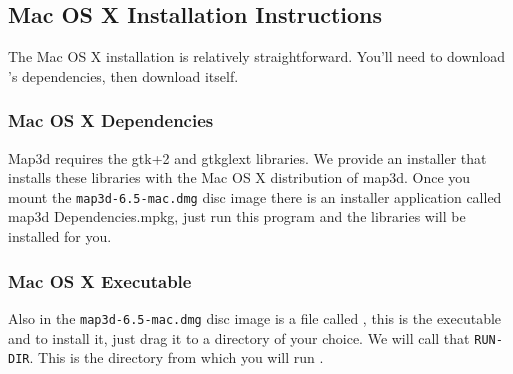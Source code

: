 \subsection{Mac OS X Installation Instructions}
\label{sec:mac-install}

The Mac OS X installation is relatively straightforward.  You'll need to 
download \map{}'s dependencies, then download \map{} itself.

\subsubsection{Mac OS X Dependencies}

Map3d requires the gtk+2 and gtkglext libraries.  We provide an installer that installs these libraries with the Mac OS X distribution of map3d.  Once you mount the \texttt{map3d-6.5-mac.dmg} disc image there is an installer application called map3d Dependencies.mpkg, just run this program and the libraries will be installed for you.


\subsubsection{Mac OS X Executable}

Also in the \texttt{map3d-6.5-mac.dmg} disc image is a file called \map{}, this is the \map{} executable and to install it, just drag it to a directory of your choice.  We will call that \texttt{RUN-DIR}. This is the directory from which you will run \map{}.






